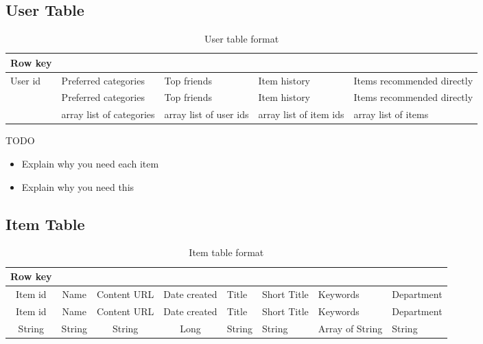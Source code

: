 \subsection{User Table}
\label{sec:users-table}

\begin{table}[h]
\centering
\caption{User table format}
\label{user-table-format}
\begin{tabular}{@{}lllll@{}}
Row key & & & & \\ \toprule
User id & Preferred categories & Top friends & Item history & Items recommended directly  \\ 
        & Preferred categories & Top friends & Item history & Items recommended directly \\ 
        & array list of categories & array list of user ids & array  list of item ids & array list of items\\ 
\end{tabular}
\end{table}


TODO
\begin{itemize}
	\item Explain why you need each item
	\item Explain why you need this		
\end{itemize}

\subsection{Item Table}
\label{sec:item-table}

\begin{table}[h]
\centering
\caption{Item table format}
\label{item-table-format}
\begin{tabular}{@{}ccccllll@{}}
Row key &  &  &  &  &  &  &  \\ \toprule
Item id & \multicolumn{1}{c}{Name} & \multicolumn{1}{c}{Content URL} & \multicolumn{1}{c}{Date created} & \multicolumn{1}{l}{Title} & \multicolumn{1}{l}{Short Title} & \multicolumn{1}{l}{Keywords} & \multicolumn{1}{l}{Department} \\ 
Item id & \multicolumn{1}{c}{Name} & \multicolumn{1}{c}{Content URL} & \multicolumn{1}{c}{Date created} & \multicolumn{1}{l}{Title} & \multicolumn{1}{l}{Short Title} & \multicolumn{1}{l}{Keywords} & \multicolumn{1}{l}{Department} \\ 
String & \multicolumn{1}{c}{String} & \multicolumn{1}{c}{String} & \multicolumn{1}{c}{Long} & \multicolumn{1}{l}{String} & \multicolumn{1}{l}{String} & \multicolumn{1}{l}{Array of String} & \multicolumn{1}{l}{String} \\ 
\end{tabular}
\end{table}

